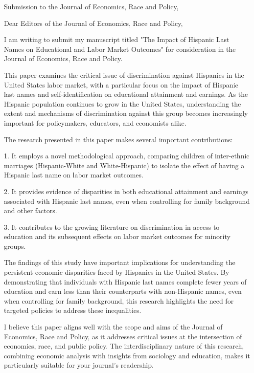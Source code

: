 \documentclass[12pt,english]{article}
\begin{document}
\thispagestyle{empty}
\begingroup
  \doublespacing
  \centering
  \LARGE Submission to the Journal of Economics, Race and Policy, \\[0.25em]
\endgroup

\noindent Dear Editors of the Journal of Economics, Race and Policy,

\bigskip
\noindent I am writing to submit my manuscript titled "The Impact of Hispanic Last Names on Educational and Labor Market Outcomes" for consideration in the Journal of Economics, Race and Policy.

\bigskip
\noindent This paper examines the critical issue of discrimination against Hispanics in the United States labor market, with a particular focus on the impact of Hispanic last names and self-identification on educational attainment and earnings. As the Hispanic population continues to grow in the United States, understanding the extent and mechanisms of discrimination against this group becomes increasingly important for policymakers, educators, and economists alike.

\bigskip
\noindent The research presented in this paper makes several important contributions:

1. It employs a novel methodological approach, comparing children of inter-ethnic marriages (Hispanic-White and White-Hispanic) to isolate the effect of having a Hispanic last name on labor market outcomes.

2. It provides evidence of disparities in both educational attainment and earnings associated with Hispanic last names, even when controlling for family background and other factors.

3. It contributes to the growing literature on discrimination in access to education and its subsequent effects on labor market outcomes for minority groups.

\bigskip
\noindent The findings of this study have important implications for understanding the persistent economic disparities faced by Hispanics in the United States. By demonstrating that individuals with Hispanic last names complete fewer years of education and earn less than their counterparts with non-Hispanic names, even when controlling for family background, this research highlights the need for targeted policies to address these inequalities.

\bigskip
\noindent I believe this paper aligns well with the scope and aims of the Journal of Economics, Race and Policy, as it addresses critical issues at the intersection of economics, race, and public policy. The interdisciplinary nature of this research, combining economic analysis with insights from sociology and education, makes it particularly suitable for your journal's readership.
\end{document}
